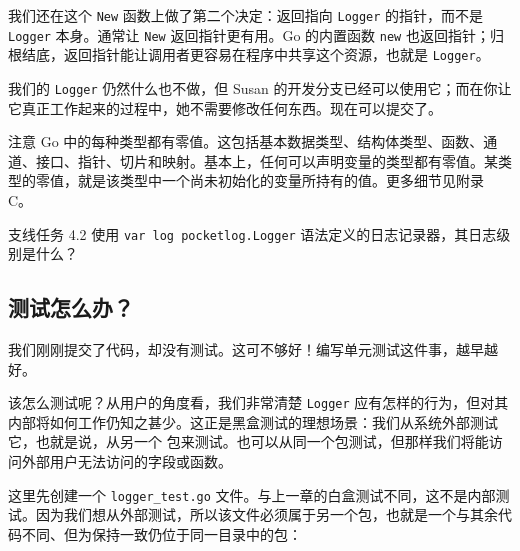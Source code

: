 我们还在这个 \texttt{New} 函数上做了第二个决定：返回指向 \texttt{Logger} 的指针，而不是 \texttt{Logger} 本身。通常让 \texttt{New} 返回指针更有用。Go 的内置函数 \texttt{new} 也返回指针；归根结底，返回指针能让调用者更容易在程序中共享这个资源，也就是 \texttt{Logger}。

我们的 \texttt{Logger} 仍然什么也不做，但 Susan 的开发分支已经可以使用它；而在你让它真正工作起来的过程中，她不需要修改任何东西。现在可以提交了。

\begin{infobox}{注意}
Go 中的每种类型都有零值。这包括基本数据类型、结构体类型、函数、通道、接口、指针、切片和映射。基本上，任何可以声明变量的类型都有零值。某类型的零值，就是该类型中一个尚未初始化的变量所持有的值。更多细节见附录 C。
\end{infobox}

\begin{infobox}{支线任务 4.2}
使用 \texttt{var log pocketlog.Logger} 语法定义的日志记录器，其日志级别是什么？
\end{infobox}

\subsection{测试怎么办？}

我们刚刚提交了代码，却没有测试。这可不够好！编写单元测试这件事，越早越好。

该怎么测试呢？从用户的角度看，我们非常清楚 \texttt{Logger} 应有怎样的行为，但对其内部将如何工作仍知之甚少。这正是黑盒测试的理想场景：我们从系统外部测试它，也就是说，从另一个
包来测试。也可以从同一个包测试，但那样我们将能访问外部用户无法访问的字段或函数。

这里先创建一个 \texttt{logger\_test.go} 文件。与上一章的白盒测试不同，这不是内部测试。因为我们想从外部测试，所以该文件必须属于另一个包，也就是一个与其余代码不同、但为保持一致仍位于同一目录中的包：

\begin{treebox}
\end{treebox}

